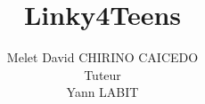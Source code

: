 \documentclass[12pt]{beamer}
\begin{document}
  
	\author[Melet David CHIRINO CAICEDO]{Melet David CHIRINO CAICEDO \\ Tuteur \\ Yann LABIT}
	\title{\textbf{Linky4Teens}}
	\begin{frame}[plain]
		\vspace*{5pt}
		\\
		\vspace*{10pt}
		\maketitle
	\end{frame}
\end{document}
